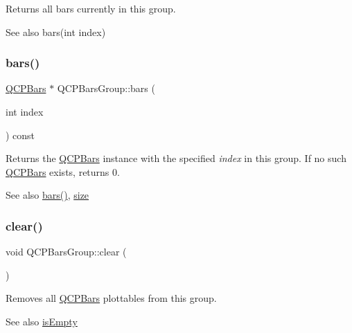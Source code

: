 Returns all bars currently in this group.

\begin{DoxySeeAlso}{See also}
bars(int index) 
\end{DoxySeeAlso}
\mbox{\label{class_q_c_p_bars_group_a0754d659a020aa7fddfe81e657ce2d92}} 
\subsubsection{\texorpdfstring{bars()}{bars()}\hspace{0.1cm}{\footnotesize\ttfamily [2/2]}}
{\footnotesize\ttfamily \hyperlink{class_q_c_p_bars}{Q\+C\+P\+Bars} $\ast$ Q\+C\+P\+Bars\+Group\+::bars (\begin{DoxyParamCaption}\item[{int}]{index }\end{DoxyParamCaption}) const}

Returns the \hyperlink{class_q_c_p_bars}{Q\+C\+P\+Bars} instance with the specified {\itshape index} in this group. If no such \hyperlink{class_q_c_p_bars}{Q\+C\+P\+Bars} exists, returns 0.

\begin{DoxySeeAlso}{See also}
\hyperlink{class_q_c_p_bars_group_a6e4f4e86abbec6a9342f204ef82abef8}{bars()}, \hyperlink{class_q_c_p_bars_group_a3780ec77919cb00840207ec7a0f00dd5}{size} 
\end{DoxySeeAlso}
\mbox{\label{class_q_c_p_bars_group_a3ddf23928c6cd89530bd34ab7ba7b177}} 
\subsubsection{\texorpdfstring{clear()}{clear()}}
{\footnotesize\ttfamily void Q\+C\+P\+Bars\+Group\+::clear (\begin{DoxyParamCaption}{ }\end{DoxyParamCaption})}

Removes all \hyperlink{class_q_c_p_bars}{Q\+C\+P\+Bars} plottables from this group.

\begin{DoxySeeAlso}{See also}
\hyperlink{class_q_c_p_bars_group_aac959e79e852e8ef9aea6e0449ad000a}{is\+Empty} 
\end{DoxySeeAlso}
\mbox{\label{class_q_c_p_bars_group_ae26da07a23553052a178fb3fae90d0dc}} 
